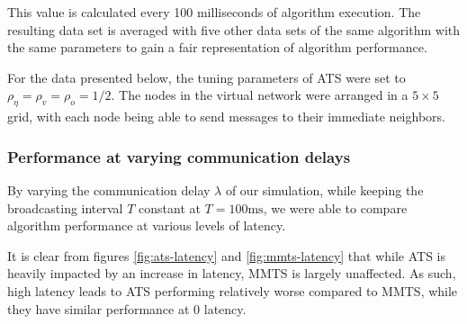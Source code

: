 \documentclass[a4paper,12pt]{article}
\begin{document}
This value is calculated every 100 milliseconds of algorithm execution. The resulting data set is averaged with five other data sets of the same algorithm with the same parameters to gain a fair representation of algorithm performance.

For the data presented below, the tuning parameters of ATS were set to $\rho_\eta = \rho_v = \rho_o = 1 / 2$. The nodes in the virtual network were arranged in a $5\times5$ grid, with each node being able to send messages to their immediate neighbors.

\subsubsection{Performance at varying communication delays}
By varying the communication delay $\lambda$ of our simulation, while keeping the broadcasting interval $T$ constant at $T = 100 \text{ms}$, we were able to compare algorithm performance at various levels of latency.

It is clear from figures \ref{fig:ats-latency} and \ref{fig:mmts-latency} that while ATS is heavily impacted by an increase in latency, MMTS is largely unaffected. As such, high latency leads to ATS performing relatively worse compared to MMTS, while they have similar performance at $0$ latency.
\end{document}
